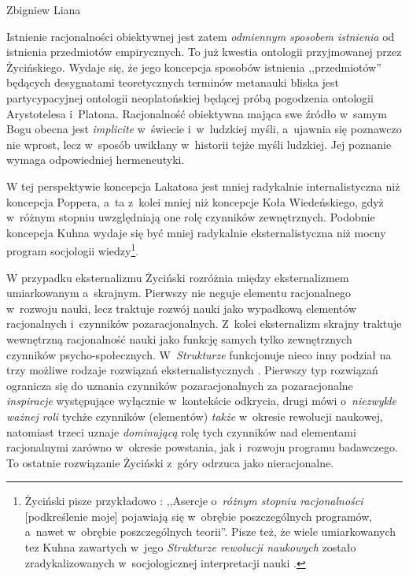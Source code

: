 \begin{artplenv}{Zbigniew Liana}
\begin{uwaga}
Istnienie racjonalności obiektywnej jest zatem \textit{odmiennym sposobem istnienia} od istnienia
przedmiotów empirycznych. To już kwestia ontologii przyjmowanej przez Życińskiego. Wydaje się, że jego koncepcja
sposobów istnienia ,,przedmiotów'' będących desygnatami teoretycznych terminów metanauki bliska jest partycypacyjnej
ontologii neoplatońskiej będącej próbą pogodzenia ontologii Arystotelesa i~Platona. Racjonalność obiektywna mająca swe
źródło w~samym Bogu obecna jest \textit{implicite} w~świecie i~w~ludzkiej myśli, a~ujawnia się poznawczo nie wprost,
lecz w~sposób uwikłany w~historii tejże myśli ludzkiej. Jej poznanie wymaga odpowiedniej hermeneutyki.
\end{uwaga}

W tej perspektywie koncepcja Lakatosa jest mniej radykalnie internalistyczna niż koncepcja Poppera, a~ta z~kolei mniej
niż koncepcje Koła Wiedeńskiego, gdyż w~różnym stopniu uwzględniają one rolę czynników zewnętrznych. Podobnie koncepcja
Kuhna wydaje się być mniej radykalnie eksternalistyczna niż mocny program socjologii wiedzy\footnote{Życiński pisze
przykładowo
\parencites*[s.~135]{zycinski_structure_1988}[s.~239]{zycinski_struktura_2013}:
,,Asercje o~\textit{różnym stopniu racjonalności}
[podkreślenie moje] pojawiają się w~obrębie poszczególnych programów, a~nawet w~obrębie poszczególnych teorii''. Pisze
też, że wiele umiarkowanych tez Kuhna zawartych w~jego \textit{Strukturze rewolucji naukowych} zostało
zradykalizowanych w~socjologicznej interpretacji nauki
\parencite[zob.][s.~207n]{zycinski_elementy_1996}.
}.

W przypadku eksternalizmu Życiński rozróżnia
\parencite*[por.][s.~135]{zycinski_elementy_1996}
między
eksternalizmem umiarkowanym a~skrajnym. Pierwszy nie neguje elementu racjonalnego w~rozwoju nauki, lecz traktuje rozwój
nauki jako wypadkową elementów racjonalnych i~czynników pozaracjonalnych. Z~kolei eksternalizm skrajny traktuje
wewnętrzną racjonalność nauki jako funkcję samych tylko zewnętrznych czynników psycho-społecznych. W~\textit{Strukturze}
funkcjonuje nieco inny podział na trzy możliwe rodzaje rozwiązań eksternalistycznych
\parencites*[s.~123n]{zycinski_structure_1988}[s.~218]{zycinski_struktura_2013}.
Pierwszy typ rozwiązań ogranicza się do uznania czynników pozaracjonalnych za
pozaracjonalne \textit{inspiracje} występujące wyłącznie w~kontekście odkrycia, drugi mówi o~\textit{niezwykle ważnej roli}
tychże czynników (elementów) \textit{także} w~okresie rewolucji naukowej, natomiast trzeci uznaje \textit{dominującą} rolę
tych czynników nad elementami racjonalnymi zarówno w~okresie powstania, jak i~rozwoju programu badawczego. To ostatnie
rozwiązanie Życiński z~góry odrzuca jako nieracjonalne.


\end{artplenv}
